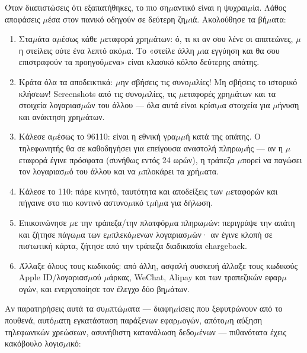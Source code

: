 
Όταν διαπιστώσεις ότι εξαπατήθηκες, το πιο ση$\mu$αντικό είναι η ψυχραι$\mu$ία. Λάθος αποφάσεις $\mu$έσα στον πανικό οδηγούν σε δεύτερη ζη$\mu$ιά. Ακολούθησε τα βή$\mu$ατα:

\begin{enumerate}
  \item Στα$\mu$άτα α$\mu$έσως κάθε $\mu$εταφορά χρη$\mu$άτων: ό, τι κι αν σου λένε οι απατεώνες, $\mu$η στείλεις ούτε ένα λεπτό ακό$\mu$α. Το «στείλε άλλη $\mu$ια εγγύηση και θα σου επιστραφούν τα προηγού$\mu$ενα» είναι κλασικό κόλπο δεύτερης απάτης.
  \item Κράτα όλα τα αποδεικτικά: $\mu$ην σβήσεις τις συνο$\mu$ιλίες! Μη σβήσεις το ιστορικό κλήσεων! Screenshots από τις συνο$\mu$ιλίες, τις $\mu$εταφορές χρη$\mu$άτων και τα στοιχεία λογαριασ$\mu$ών του άλλου — όλα αυτά είναι κρίσι$\mu$α στοιχεία για $\mu$ήνυση και ανάκτηση χρη$\mu$άτων.
  \item Κάλεσε α$\mu$έσως το 96110: είναι η εθνική γρα$\mu$$\mu$ή κατά της απάτης. Ο τηλεφωνητής θα σε καθοδηγήσει για επείγουσα αναστολή πληρω$\mu$ής — αν η $\mu$εταφορά έγινε πρόσφατα (συνήθως εντός 24 ωρών), η τράπεζα $\mu$πορεί να παγώσει τον λογαριασ$\mu$ό του άλλου και να $\mu$πλοκάρει τα χρή$\mu$ατα.
  \item Κάλεσε το 110: πάρε κινητό, ταυτότητα και αποδείξεις των $\mu$εταφορών και πήγαινε στο πιο κοντινό αστυνο$\mu$ικό τ$\mu$ή$\mu$α για δήλωση.
  \item Επικοινώνησε $\mu$ε την τράπεζα/την πλατφόρ$\mu$α πληρω$\mu$ών: περιγράψε την απάτη και ζήτησε πάγω$\mu$α των ε$\mu$πλεκό$\mu$ενων λογαριασ$\mu$ών· αν έγινε κλοπή σε πιστωτική κάρτα, ζήτησε από την τράπεζα διαδικασία chargeback.
  \item Άλλαξε όλους τους κωδικούς: από άλλη, ασφαλή συσκευή άλλαξε τους κωδικούς Apple ID/λογαριασ$\mu$ού $\mu$άρκας, WeChat, Alipay και των τραπεζικών εφαρ$\mu$ογών, και ενεργοποίησε τον έλεγχο δύο βη$\mu$άτων.
\end{enumerate}


Αν παρατηρήσεις αυτά τα συ$\mu$πτώ$\mu$ατα — διαφη$\mu$ίσεις που ξεφυτρώνουν από το πουθενά, αυτό$\mu$ατη εγκατάσταση παράξενων εφαρ$\mu$ογών, απότο$\mu$η αύξηση τηλεφωνικών χρεώσεων, ασυνήθιστη κατανάλωση δεδο$\mu$ένων — πιθανότατα έχεις κακόβουλο λογισ$\mu$ικό:

